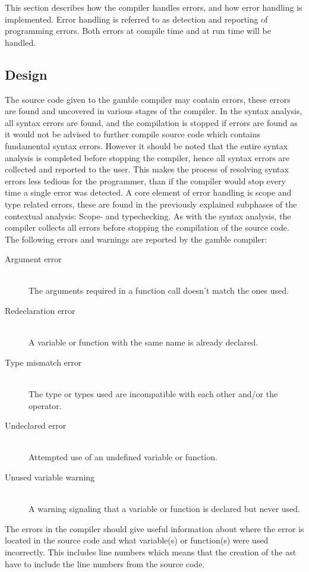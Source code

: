 This section describes how the compiler handles errors, and how error handling is implemented.
Error handling is referred to as detection and reporting of programming errors. 
Both errors at compile time and at run time will be handled.
\subsection*{Design}\label{subsec:DesignErrorHandling}
The source code given to the \gls{gamble} compiler may contain errors, these errors are found and uncovered in various stages of the compiler.   
In the syntax analysis, all syntax errors are found, and the compilation is stopped if errors are found as it would not be advised to further compile source code which contains fundamental syntax errors.
However it should be noted that the entire syntax analysis is completed before stopping the compiler, hence all syntax errors are collected and reported to the user.
This makes the process of resolving syntax errors less tedious for the programmer, than if the compiler would stop every time a single error was detected. 
A core element of error handling is scope and type related errors, these are found in the previously explained subphases of the contextual analysis: Scope- and typechecking.
As with the syntax analysis, the compiler collects all errors before stopping the compilation of the source code. 
The following errors and warnings are reported by the \gls{gamble} compiler:
\begin{description}
	\item[Argument error]\hfill\\ 
	The arguments required in a function call doesn't match the ones used.
	\item[Redeclaration error]\hfill\\ 
	A variable or function with the same name is already declared.
	\item[Type mismatch error]\hfill\\ 
	The type or types used are incompatible with each other and/or the operator. 
	\item[Undeclared error]\hfill\\ 
	Attempted use of an undefined variable or function.
	\item[Unused variable warning]\hfill\\ 
	A warning signaling that a variable or function is declared but never used.
\end{description} 
The errors in the compiler should give useful information about where the error is located in the source code and what variable(s) or function(s) were used incorrectly.
This includes line numbers which means that the creation of the \acrshort{ast} have to include the line numbers from the source code.

